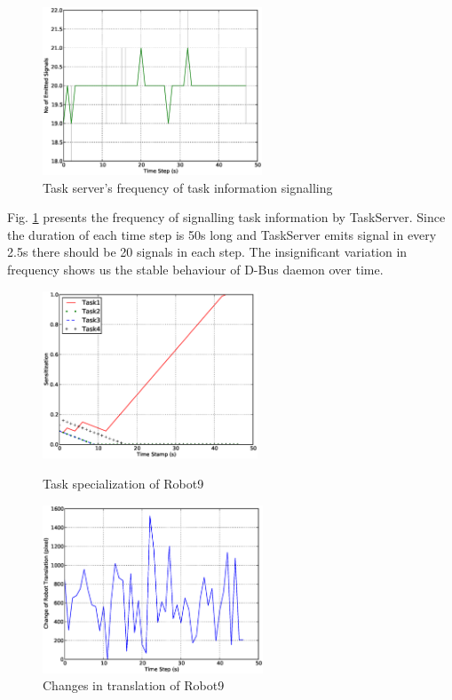 \documentclass{llncs}
\begin{document}
\begin{figure}
\centering
\includegraphics[height=5cm, angle=0]
{images/global/Global-SignalingFreqStat.eps}
\caption{\small Task server's frequency of task information signalling}
\label{fig:signal-frequency-stat} %
\end{figure}
Fig. \ref{fig:signal-frequency-stat} presents the frequency of signalling task information by TaskServer. Since the duration of each time step is 50s long and TaskServer emits signal in every 2.5s there should be 20 signals in each step. The insignificant variation in frequency shows us the stable behaviour of D-Bus daemon over time.
\begin{figure}
\begin{minipage}[t]{0.5\linewidth}
\centering
\includegraphics[height=5cm, angle=0]{images/global/PlotRobot9-Sensitizations-2010Feb18-121037.eps}
\caption{\small Task specialization of Robot9}
\label{fig:single-robot-sensitizations} %
\end{minipage} 
\begin{minipage}[t]{0.5\linewidth}
\centering
\includegraphics[height=5cm, angle=0]{images/global/DeltaRobot9-PoseAtTS-2010Feb18-121037.eps}
\caption{\small Changes in translation of Robot9}
\label{fig:single-robot-translation} %
\end{minipage}
\end{figure}
\end{document}
